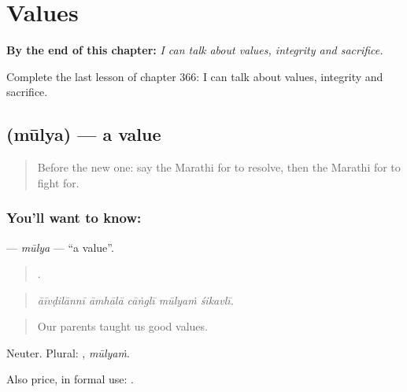 
\chapter{Values}
\label{ch:mr-values}

\begin{chapteropening}
\textbf{By the end of this chapter:} \emph{I can talk about values, integrity and sacrifice.}

Complete the last lesson of chapter 366: I can talk about values, integrity and sacrifice.
\end{chapteropening}

\section[\texorpdfstring{\mr{मूल्य} (mūlya)}{मूल्य (mūlya)}]{ (mūlya) — a value}

\label{lesson:MR-C366-mulya}



\begin{quote}
Before the new one: say the Marathi for to resolve, then the Marathi for to fight for.
\end{quote}

\subsection*{You'll want to know: }
\textbf{} — \emph{mūlya} — \textquotedblleft{}a value\textquotedblright{}.

\begin{quote}
    .
\end{quote}

\begin{quote}
\emph{āīvḍilānnī āmhālā cāṅglī mūlyaṁ śikavlī.}
\end{quote}

\begin{quote}
Our parents taught us good values.
\end{quote}

Neuter. Plural: , \emph{mūlyaṁ}.

Also price, in formal use:  .

